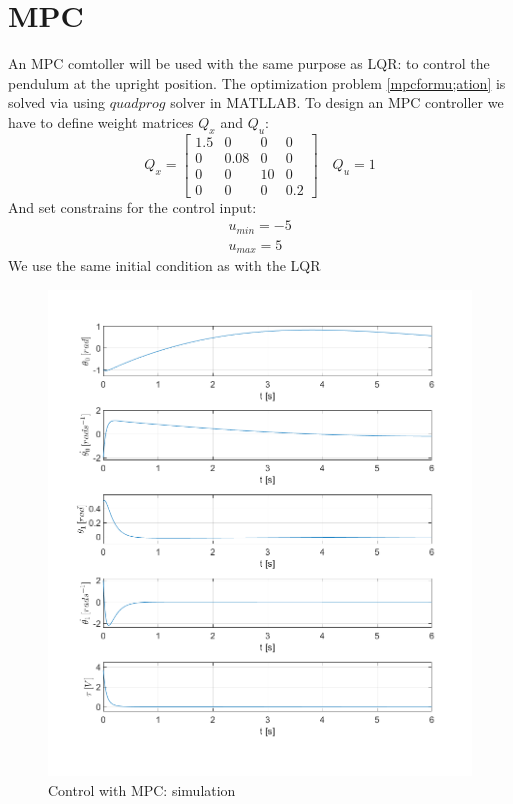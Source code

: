 \section{MPC}
An MPC comtoller will be used with the same purpose as LQR: to control the pendulum at the upright position. The optimization problem \ref{mpcformu;ation} is solved via using $quadprog$ solver in MATLLAB.
To design an MPC controller we have to define weight matrices $Q_x$ and $Q_u$:
\begin{equation}
Q_x = \begin{bmatrix}
1.5&0&0&0\\
0&0.08&0&0\\
0&0&10&0\\
0&0&0&0.2
\end{bmatrix} \quad Q_u = 1
\end{equation}
And set constrains for the control input:
\begin{equation}
	\begin{split}
	u_{min} = -5\\
	u_{max} = 5
	\end{split}
\end{equation}
We use the same initial condition as with the LQR
\newpage
\begin{figure}[H]
	\centering
	\includegraphics[width=1.1\linewidth]{images/MPC}
	\caption{Control with MPC: simulation}
	\label{mpc}
\end{figure}
\newpage
